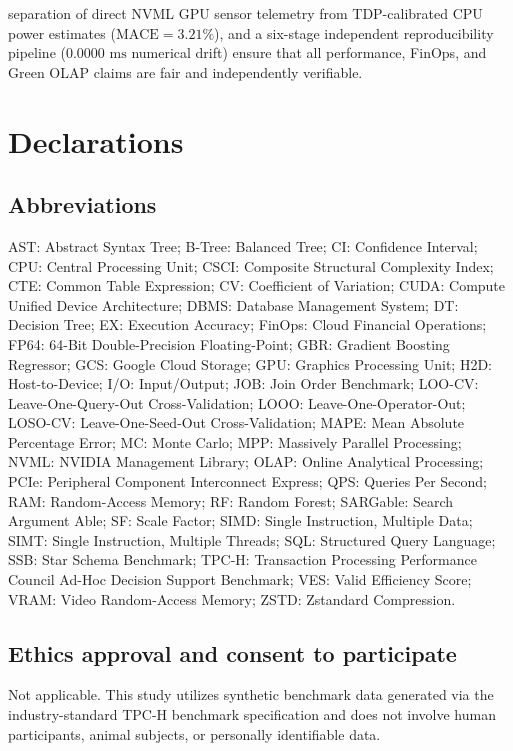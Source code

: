 \documentclass[10pt,a4paper]{article}
\begin{document}
separation of direct NVML GPU sensor telemetry from TDP-calibrated CPU power estimates ($\text{MACE}=3.21\%$), and a six-stage independent reproducibility pipeline ($0.0000\text{ ms}$ numerical drift) ensure that all performance, FinOps, and Green OLAP claims are fair and independently verifiable.

\section*{Declarations}

\subsection*{Abbreviations}
AST: Abstract Syntax Tree; B-Tree: Balanced Tree; CI: Confidence Interval; CPU: Central Processing Unit; CSCI: Composite Structural Complexity Index; CTE: Common Table Expression; CV: Coefficient of Variation; CUDA: Compute Unified Device Architecture; DBMS: Database Management System; DT: Decision Tree; EX: Execution Accuracy; FinOps: Cloud Financial Operations; FP64: 64-Bit Double-Precision Floating-Point; GBR: Gradient Boosting Regressor; GCS: Google Cloud Storage; GPU: Graphics Processing Unit; H2D: Host-to-Device; I/O: Input/Output; JOB: Join Order Benchmark; LOO-CV: Leave-One-Query-Out Cross-Validation; LOOO: Leave-One-Operator-Out; LOSO-CV: Leave-One-Seed-Out Cross-Validation; MAPE: Mean Absolute Percentage Error; MC: Monte Carlo; MPP: Massively Parallel Processing; NVML: NVIDIA Management Library; OLAP: Online Analytical Processing; PCIe: Peripheral Component Interconnect Express; QPS: Queries Per Second; RAM: Random-Access Memory; RF: Random Forest; SARGable: Search Argument Able; SF: Scale Factor; SIMD: Single Instruction, Multiple Data; SIMT: Single Instruction, Multiple Threads; SQL: Structured Query Language; SSB: Star Schema Benchmark; TPC-H: Transaction Processing Performance Council Ad-Hoc Decision Support Benchmark; VES: Valid Efficiency Score; VRAM: Video Random-Access Memory; ZSTD: Zstandard Compression.

\subsection*{Ethics approval and consent to participate}
Not applicable. This study utilizes synthetic benchmark data generated via the industry-standard TPC-H benchmark specification \cite{tpc2022tpch} and does not involve human participants, animal subjects, or personally identifiable data.
\end{document}
